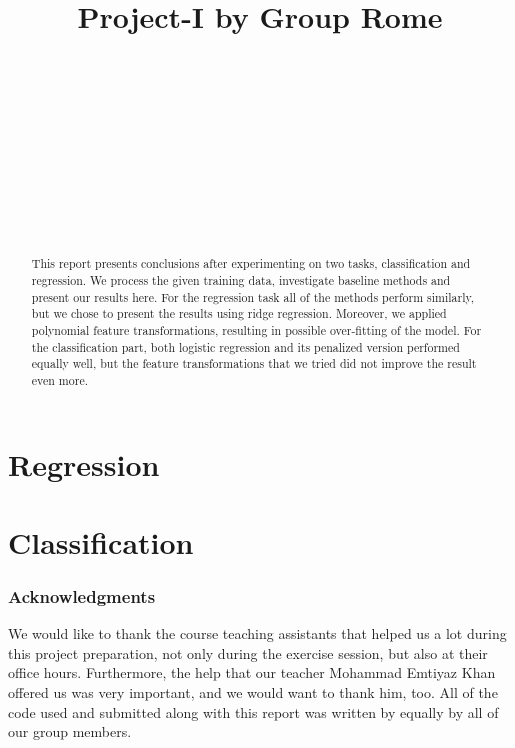 \documentclass{article} %
\title{Project-I by Group Rome}
\author{
\fontsize{8}{8}\selectfont{Cimen Gokcen}\\
\fontsize{8}{8}\selectfont{EPFL} \\
\fontsize{8}{8}\selectfont{\texttt{gokcen.cimen@epfl.ch}} \\
\And
\fontsize{8}{8}\selectfont{Petrescu Viviana}\\
\fontsize{8}{8}\selectfont{EPFL} \\
\fontsize{8}{8}\selectfont{\texttt{viviana.petrescu@epfl.ch}} \\
\And
\fontsize{8}{8}\selectfont{Angelopoulos Vasileios} \\
\fontsize{8}{8}\selectfont{EPFL} \\
\fontsize{8}{8}\selectfont{\texttt{vasileios.angelopoulos@epfl.ch}} \\
}
\begin{document}
\maketitle

\begin{abstract}
This report presents conclusions after experimenting on two tasks, classification and regression. We process the given training data, investigate baseline methods and present our results here. For the regression task all of the methods perform similarly, but we chose to present the results using ridge regression. Moreover, we applied polynomial feature transformations, resulting in possible over-fitting of the model. For the classification part, both logistic regression and its penalized version performed equally well, but the feature transformations that we tried did not improve the result even more.
\end{abstract}

\section{Regression}


\section{Classification}


\subsubsection*{Acknowledgments}
We would like to thank the course teaching assistants that helped us a lot during this project preparation, not only during the exercise session, but also at their office hours. Furthermore, the help that our teacher Mohammad Emtiyaz Khan offered us was very  important, and we would want to thank him, too. All of the code used and submitted along with this report was written by equally by all of our group members.
\end{document}
